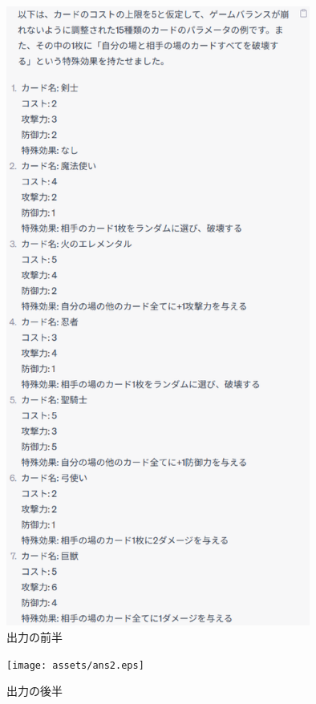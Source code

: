 \documentclass{jarticle}     %
\begin{document}
\begin{figure}[ht]
  \centering
  \includegraphics[width=100mm]{assets/ans1.eps}
  \vspace{-0.3cm}
  \caption{出力の前半}
  \label{fig:ans1}
\end{figure}

\begin{figure}[ht]
  \centering
  \texttt{[image: assets/ans2.eps]}
  \vspace{-0.3cm}
  \caption{出力の後半}
  \label{fig:ans2}
\end{figure}






\end{document}
